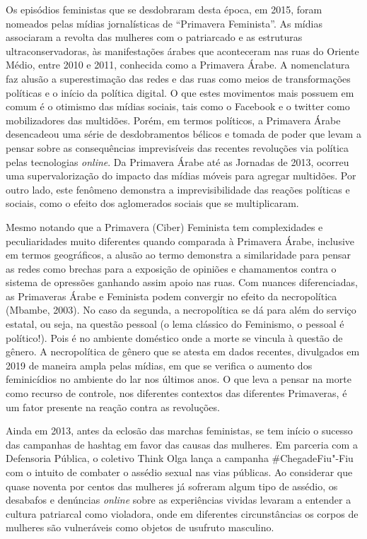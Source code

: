Os episódios feministas que se desdobraram desta época, em 2015, foram
nomeados pelas mídias jornalísticas de ``Primavera Feminista''. As
mídias associaram a revolta das mulheres com o patriarcado e as
estruturas ultraconservadoras, às manifestações árabes que aconteceram
nas ruas do Oriente Médio, entre 2010 e 2011, conhecida como a Primavera
Árabe. A nomenclatura faz alusão a superestimação das redes e das ruas
como meios de transformações políticas e o início da política digital. O
que estes movimentos mais possuem em comum é o otimismo das mídias
sociais, tais como o Facebook e o twitter como mobilizadores das
multidões. Porém, em termos políticos, a Primavera Árabe desencadeou uma
série de desdobramentos bélicos e tomada de poder que levam a pensar
sobre as consequências imprevisíveis das recentes revoluções via
política pelas tecnologias \emph{online}. Da Primavera Árabe até as Jornadas
de 2013, ocorreu uma supervalorização do impacto das mídias móveis para
agregar multidões. Por outro lado, este fenômeno demonstra a
imprevisibilidade das reações políticas e sociais, como o efeito dos
aglomerados sociais que se multiplicaram.

Mesmo notando que a Primavera (Ciber) Feminista tem complexidades e
peculiaridades muito diferentes quando comparada à Primavera Árabe,
inclusive em termos geográficos, a alusão ao termo demonstra a
similaridade para pensar as redes como brechas para a exposição de
opiniões e chamamentos contra o sistema de opressões ganhando assim
apoio nas ruas. Com nuances diferenciadas, as Primaveras Árabe e
Feminista podem convergir no efeito da necropolítica (Mbambe, 2003). No
caso da segunda, a necropolítica se dá para além do serviço estatal, ou
seja, na questão pessoal (o lema clássico do Feminismo, o pessoal é
político!). Pois é no ambiente doméstico onde a morte se vincula à
questão de gênero. A necropolítica de gênero que se atesta em dados
recentes, divulgados em 2019 de maneira ampla pelas mídias, em que se
verifica o aumento dos feminicídios no ambiente do lar nos últimos anos.
O que leva a pensar na morte como recurso de controle, nos diferentes
contextos das diferentes Primaveras, é um fator presente na reação
contra as revoluções.

Ainda em 2013, antes da eclosão das marchas feministas, se tem início o
sucesso das campanhas de hashtag em favor das causas das mulheres. Em
parceria com a Defensoria Pública, o coletivo Think Olga lança a
campanha \#ChegadeFiu"-Fiu com o intuito de combater o assédio sexual nas
vias públicas. Ao considerar que quase noventa por centos das mulheres
já sofreram algum tipo de assédio, os desabafos e denúncias \emph{online}
sobre as experiências vividas levaram a entender a cultura patriarcal
como violadora, onde em diferentes circunstâncias os corpos de mulheres
são vulneráveis como objetos de usufruto masculino.

